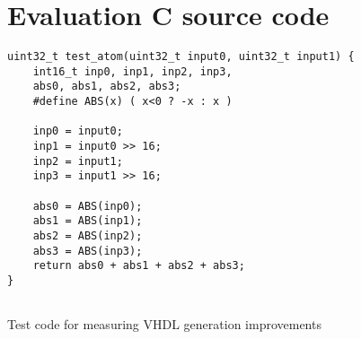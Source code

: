 \begin{figure}
	\centering
	\section{Evaluation C source code}
	\begin{lstlisting}[frame=single]
uint32_t test_atom(uint32_t input0, uint32_t input1) {
	int16_t inp0, inp1, inp2, inp3,
	abs0, abs1, abs2, abs3;
	#define ABS(x) ( x<0 ? -x : x )
	
	inp0 = input0;
	inp1 = input0 >> 16;
	inp2 = input1;
	inp3 = input1 >> 16;
	
	abs0 = ABS(inp0);
	abs1 = ABS(inp1);
	abs2 = ABS(inp2);
	abs3 = ABS(inp3);
	return abs0 + abs1 + abs2 + abs3;
}
	
	\end{lstlisting}
	\caption{Test code for measuring VHDL generation improvements}
	\label{code:vhdl-eval}
\end{figure}